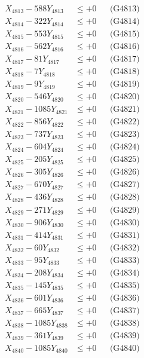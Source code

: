 \documentclass[a4paper,10pt]{article}
\begin{document}
{\begin{align}
X_{4813} - 588Y_{4813} &\leq +0 && \text{(G4813)} \\
X_{4814} - 322Y_{4814} &\leq +0 && \text{(G4814)} \\
X_{4815} - 553Y_{4815} &\leq +0 && \text{(G4815)} \\
X_{4816} - 562Y_{4816} &\leq +0 && \text{(G4816)} \\
X_{4817} - 81Y_{4817} &\leq +0 && \text{(G4817)} \\
X_{4818} - 7Y_{4818} &\leq +0 && \text{(G4818)} \\
X_{4819} - 9Y_{4819} &\leq +0 && \text{(G4819)} \\
X_{4820} - 546Y_{4820} &\leq +0 && \text{(G4820)} \\
\allowbreak
X_{4821} - 1085Y_{4821} &\leq +0 && \text{(G4821)} \\
X_{4822} - 856Y_{4822} &\leq +0 && \text{(G4822)} \\
X_{4823} - 737Y_{4823} &\leq +0 && \text{(G4823)} \\
X_{4824} - 604Y_{4824} &\leq +0 && \text{(G4824)} \\
X_{4825} - 205Y_{4825} &\leq +0 && \text{(G4825)} \\
X_{4826} - 305Y_{4826} &\leq +0 && \text{(G4826)} \\
X_{4827} - 670Y_{4827} &\leq +0 && \text{(G4827)} \\
X_{4828} - 436Y_{4828} &\leq +0 && \text{(G4828)} \\
X_{4829} - 271Y_{4829} &\leq +0 && \text{(G4829)} \\
X_{4830} - 906Y_{4830} &\leq +0 && \text{(G4830)} \\
\allowbreak
X_{4831} - 414Y_{4831} &\leq +0 && \text{(G4831)} \\
X_{4832} - 60Y_{4832} &\leq +0 && \text{(G4832)} \\
X_{4833} - 95Y_{4833} &\leq +0 && \text{(G4833)} \\
X_{4834} - 208Y_{4834} &\leq +0 && \text{(G4834)} \\
X_{4835} - 145Y_{4835} &\leq +0 && \text{(G4835)} \\
X_{4836} - 601Y_{4836} &\leq +0 && \text{(G4836)} \\
X_{4837} - 665Y_{4837} &\leq +0 && \text{(G4837)} \\
X_{4838} - 1085Y_{4838} &\leq +0 && \text{(G4838)} \\
X_{4839} - 361Y_{4839} &\leq +0 && \text{(G4839)} \\
X_{4840} - 1085Y_{4840} &\leq +0 && \text{(G4840)} \\

\end{align}}
\end{document}
